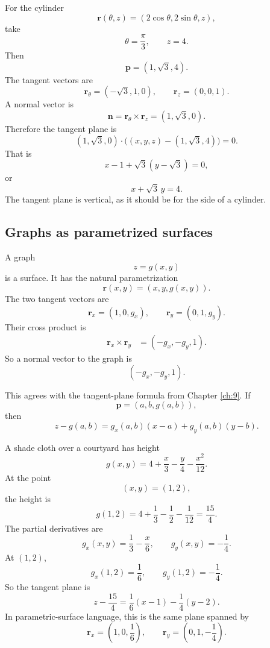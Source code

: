 \begin{example}
For the cylinder
\[
    \mathbf r(\theta,z)=(2\cos\theta,2\sin\theta,z),
\]
take
\[
    \theta=\frac{\pi}{3},
    \qquad
    z=4.
\]
Then
\[
    \mathbf p=(1,\sqrt3,4).
\]
The tangent vectors are
\[
    \mathbf r_\theta=(-\sqrt3,1,0),
    \qquad
    \mathbf r_z=(0,0,1).
\]
A normal vector is
\[
    \mathbf n=\mathbf r_\theta\times\mathbf r_z=(1,\sqrt3,0).
\]
Therefore the tangent plane is
\[
    (1,\sqrt3,0)\cdot\bigl((x,y,z)-(1,\sqrt3,4)\bigr)=0.
\]
That is
\[
    x-1+\sqrt3(y-\sqrt3)=0,
\]
or
\[
\boxed{
    x+\sqrt3\,y=4.
}
\]
The tangent plane is vertical, as it should be for the side of a cylinder.
\end{example}

\subsection{Graphs as parametrized surfaces}

A graph
\[
    z=g(x,y)
\]
is a surface.  It has the natural parametrization
\[
\boxed{
    \mathbf r(x,y)=(x,y,g(x,y)).
}
\]
The two tangent vectors are
\[
    \mathbf r_x=(1,0,g_x),
    \qquad
    \mathbf r_y=(0,1,g_y).
\]
Their cross product is
\[
\begin{aligned}
    \mathbf r_x\times \mathbf r_y
    &=
    (-g_x,-g_y,1).
\end{aligned}
\]
So a normal vector to the graph is
\[
\boxed{
    (-g_x,-g_y,1).
}
\]

This agrees with the tangent-plane formula from Chapter \ref{ch:9}.  If
\[
    \mathbf p=(a,b,g(a,b)),
\]
then
\[
    z-g(a,b)=g_x(a,b)(x-a)+g_y(a,b)(y-b).
\]

\begin{example}
A shade cloth over a courtyard has height
\[
    g(x,y)=4+\frac{x}{3}-\frac{y}{4}-\frac{x^2}{12}.
\]
At the point
\[
    (x,y)=(1,2),
\]
the height is
\[
    g(1,2)
    =
    4+\frac13-\frac12-\frac1{12}
    =
    \frac{15}{4}.
\]
The partial derivatives are
\[
    g_x(x,y)=\frac13-\frac{x}{6},
    \qquad
    g_y(x,y)=-\frac14.
\]
At \((1,2)\),
\[
    g_x(1,2)=\frac16,
    \qquad
    g_y(1,2)=-\frac14.
\]
So the tangent plane is
\[
\boxed{
    z-\frac{15}{4}
    =
    \frac16(x-1)-\frac14(y-2).
}
\]
In parametric-surface language, this is the same plane spanned by
\[
    \mathbf r_x=\left(1,0,\frac16\right),
    \qquad
    \mathbf r_y=\left(0,1,-\frac14\right).
\]
\end{example}

